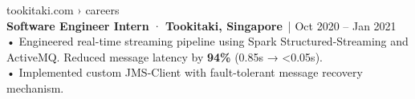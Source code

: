 \documentclass[letterpaper,10pt]{article}
\begin{document}
\begin{minipage}[t]{0.58\textwidth}
\vspace{5pt}

{\selectfont\footnotesize\color{UrlGreen}tookitaki.com › careers}\\[-2pt]
{\selectfont\color{LinkBlue}\normalsize\bfseries Software Engineer Intern} {\normalsize· \textbf{Tookitaki, Singapore}}~{\footnotesize\color{SubtleGray}| Oct 2020 -- Jan 2021}\\[1pt]
{\selectfont\small\color{TextBlack}%
• Engineered real-time streaming pipeline using Spark Structured-Streaming and ActiveMQ. Reduced message latency by \textbf{94\%} (0.85s → <0.05s).\\[1pt]
• Implemented custom JMS-Client with fault-tolerant message recovery mechanism.%
}

\end{minipage}%
\hfill%
\end{document}
